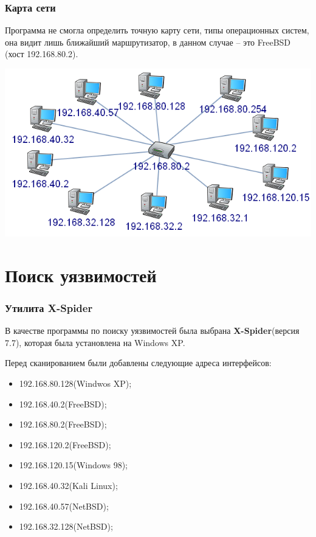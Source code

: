 \documentclass[9pt, compress]{beamer}
\begin{document}
\begin{frame}[fragile]
\frametitle{Карта сети}
Программа не смогла определить точную карту сети, типы операционных систем, она видит лишь ближайший маршрутизатор, в данном случае – это FreeBSD (хост 192.168.80.2).
\begin{center}  
	\includegraphics[width=.8\textwidth]{img/3}
\end{center}
\end{frame}

\section{Поиск уязвимостей}

\begin{frame}[fragile]
\frametitle{Утилита X-Spider}
В качестве программы по поиску уязвимостей была выбрана \textbf{X-Spider}(версия 7.7), которая была установлена на Windows XP.

Перед сканированием были добавлены следующие адреса интерфейсов:
\begin{itemize}
\item 192.168.80.128(Windwos XP);
\item 192.168.40.2(FreeBSD);
\item 192.168.80.2(FreeBSD);
\item 192.168.120.2(FreeBSD);
\item 192.168.120.15(Windows 98);
\item 192.168.40.32(Kali Linux);
\item 192.168.40.57(NetBSD);
\item 192.168.32.128(NetBSD);
\end{itemize}
\end{frame}
\end{document}
